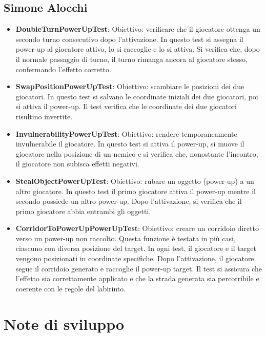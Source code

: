 \documentclass[a4paper,12pt]{report}
\begin{document}
\subsection{Simone Alocchi}
\begin{itemize}
	\item \textbf{DoubleTurnPowerUpTest}: 
	Obiettivo: verificare che il giocatore ottenga un secondo turno consecutivo dopo l’attivazione.  
	In questo test si assegna il power-up al giocatore attivo, lo si raccoglie e lo si attiva.  
	Si verifica che, dopo il normale passaggio di turno, il turno rimanga ancora al giocatore stesso, confermando l’effetto corretto.
	\item \textbf{SwapPositionPowerUpTest}: 
	Obiettivo: scambiare le posizioni dei due giocatori.  
	In questo test si salvano le coordinate iniziali dei due giocatori, poi si attiva il power-up.  
	Il test verifica che le coordinate dei due giocatori risultino invertite.
	\item \textbf{InvulnerabilityPowerUpTest}:
	Obiettivo: rendere temporaneamente invulnerabile il giocatore.  
	In questo test si attiva il power-up, si muove il giocatore nella posizione di un nemico e si verifica che, 
	nonostante l’incontro, il giocatore non subisca effetti negativi.
	\item \textbf{StealObjectPowerUpTest}: 
	Obiettivo: rubare un oggetto (power-up) a un altro giocatore.  
	In questo test il primo giocatore attiva il power-up mentre il secondo possiede un altro power-up.  
	Dopo l’attivazione, si verifica che il primo giocatore abbia entrambi gli oggetti.
	\item \textbf{CorridorToPowerUpPowerUpTest}: 
	Obiettivo: creare un corridoio diretto verso un power-up non raccolto.  
	Questa funzione è testata in più casi, ciascuno con diversa posizione del target.
	In ogni test, il giocatore e il target vengono posizionati in coordinate specifiche.  
	Dopo l’attivazione, il giocatore segue il corridoio generato e raccoglie il power-up target.  
	Il test si assicura che l’effetto sia correttamente applicato e che la strada generata sia percorribile e coerente con le regole del labirinto.
\end{itemize}

\section{Note di sviluppo}
\end{document}

